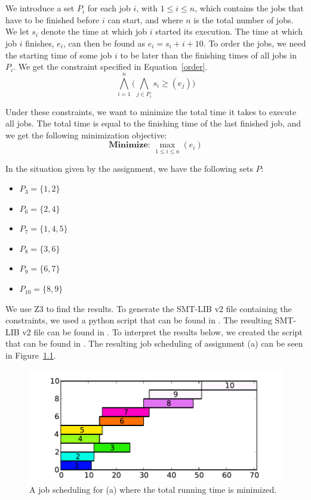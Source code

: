 \chapter{}\label{chp:3}
We introduce a set $P_i$ for each job $i$, with $1 \leq i \leq n$, which contains the jobs that have to be finished before $i$ can start, and where $n$ is the total number of jobs. We let $s_i$ denote the time at which job $i$ started its execution. The time at which job $i$ finishes, $e_i$, can then be found as $e_i = s_i + i + 10$. To order the jobs, we need the starting time of some job $i$ to be later than the finishing times of all jobs in $P_i$. We get the constraint specified in Equation~\ref{order}.
\begin{equation}
    \label{order}
    \bigwedge^{n}_{i=1}\big(\bigwedge_{j\in P_i} s_i \geq (e_j)\big)
\end{equation}

Under these constraints, we want to minimize the total time it takes to execute all jobs. The total time is equal to the finishing time of the last finished job, and we get the following minimization objective:
\begin{equation}
    \textbf{Minimize: }\max_{1\leq i \leq n}(e_i)
\end{equation}

In the situation given by the assignment, we have the following sets $P$:
\begin{itemize}
    \item $P_3 = \{1,2\}$
    \item $P_6 = \{2,4\}$
    \item $P_7 = \{1,4,5\}$
    \item $P_8 = \{3,6\}$
    \item $P_9 = \{6,7\}$
    \item $P_{10} = \{8,9\}$
\end{itemize}
We use Z3 to find the results. To generate the SMT-LIB v2 file containing the constraints, we used a python script that can be found in . The resulting SMT-LIB v2 file can be found in . To interpret the results below, we created the script that can be found in . The resulting job scheduling of assignment (a) can be seen in Figure~\ref{fig:3a}.
\begin{figure}[H]
    \centering
    \includegraphics[width=\columnwidth]{3/a.pdf}
    \caption{A job scheduling for (a) where the total running time is minimized.}
    \label{fig:3a}
\end{figure}

